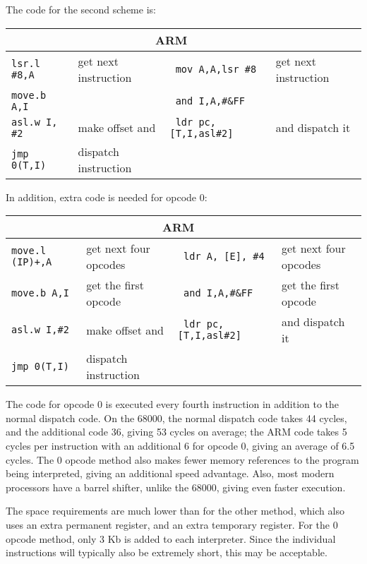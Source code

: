 \documentclass{article}
\newenvironment{code}%
{\begin{small}\begin{tabular}{>{\tt}ll>{\tt}ll}\toprule%
\multicolumn{2}{c}{\bf 68000} & \multicolumn{2}{c}{\bf ARM} \\%
\midrule}%
{\bottomrule\end{tabular}\end{small}}
\begin{document}
The code for the second scheme is:

\begin{center}
\begin{code}

lsr.l \#8,A & get next instruction & mov A,A,lsr \#8 & get next instruction\\

move.b A,I && and I,A,\#\&FF &\\

asl.w I, \#2 & make offset and & ldr pc,{[}T,I,asl\#2{]} & and dispatch it \\

jmp 0(T,I) & dispatch instruction &&\\

\end{code}
\end{center}
\noindent In addition, extra code is needed for opcode 0:

\begin{center}
\begin{code}

move.l (IP)+,A & get next four opcodes & ldr A, {[}E{]}, \#4 & get next four opcodes\\

move.b A,I & get the first opcode & and I,A,\#\&FF & get the first opcode \\

asl.w I,\#2 & make offset and & ldr pc, {[}T,I,asl\#2{]} & and dispatch it \\

jmp 0(T,I) & dispatch instruction &&\\

\end{code}
\end{center}
\noindent The code for opcode 0 is executed every fourth instruction in addition
to the normal dispatch code. On the 68000, the normal dispatch code takes 44 cycles,
and the additional code 36, giving 53 cycles on average; the ARM code takes 5
cycles per instruction with an additional 6 for opcode 0, giving an average of
6.5 cycles. The 0 opcode method also makes fewer memory references to the program
being interpreted, giving an additional speed advantage. Also, most modern processors
have a barrel shifter, unlike the 68000, giving even faster execution.

The space requirements are much lower than for the other method, which also uses
an extra permanent register, and an extra temporary register. For the 0 opcode
method, only 3 Kb is added to each interpreter. Since the individual instructions
will typically also be extremely short, this may be acceptable.
\end{document}
